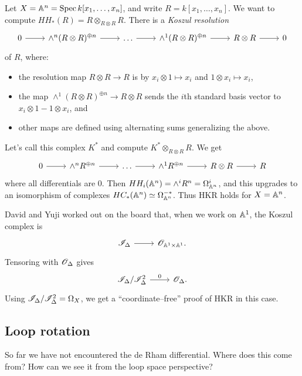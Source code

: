\documentclass{article}
\begin{document}
\begin{ex}
  Let $X = \AA^n = \Spec k[x_1, \dots, x_n]$, and write $R = k[x_1, \dots, x_n]$.
  We want to compute $HH_*(R) = R \otimes_{R \otimes R} R$.
  There is a \emph{Koszul resolution}
  \[
    \begin{tikzcd}
      0 \rar & \wedge^n (R \otimes R)^{\oplus n} \rar & \dots \rar & \wedge^1 (R \otimes R)^{\oplus n} \rar & R \otimes R \rar & 0
    \end{tikzcd}
  \]
  of $R$, where:
  \begin{itemize}
    \item the resolution map $R \otimes R \to R$ is by $x_i \otimes 1 \mapsto x_i$ and $1 \otimes x_i \mapsto x_i$,
    \item the map $\wedge^1 (R \otimes R)^{\oplus n} \to R \otimes R$ sends the $i$th standard basis vector to $x_i \otimes 1 - 1 \otimes x_i$, and
    \item other maps are defined using alternating sums generalizing the above.
  \end{itemize}
  Let's call this complex $K^*$ and compute $K^* \otimes_{R \otimes R} R$.
  We get
  \[
    \begin{tikzcd}
      0 \rar & \wedge^n R^{\oplus n} \rar & \dots \rar & \wedge^1 R^{\oplus n} \rar & R \otimes R \rar & R
    \end{tikzcd}
  \]
  where all differentials are $0$.
  Then $HH_i(\AA^n) = \wedge^i R^n = \Omega^i_{\AA^n}$, and this upgrades to an isomorphism of complexes $HC_*(\AA^n) \simeq \Omega^{-*}_{\AA^n}$.
  Thus HKR holds for $X = \AA^n$.

  David and Yuji worked out on the board that, when we work on $\AA^1$, the Koszul complex is
  \[
    \begin{tikzcd}
      \Isc_\Delta \rar & \Osc_{\AA^1 \times \AA^1}.
    \end{tikzcd}
  \]
  Tensoring with $\Osc_{\Delta}$ gives 
  \[
    \begin{tikzcd}
      \Isc_\Delta / \Isc_{\Delta}^2 \rar["0"] & \Osc_{\Delta}.
    \end{tikzcd}
  \]
  Using $\Isc_\Delta / \Isc_{\Delta}^2 = \Omega_X$, we get a ``coordinate--free'' proof of HKR in this case.
\end{ex}

\subsection{Loop rotation}

So far we have not encountered the de Rham differential.
Where does this come from?
How can we see it from the loop space perspective?
\end{document}
